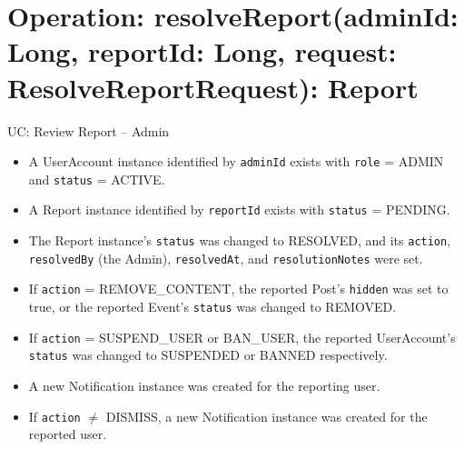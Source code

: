 \documentclass[11pt]{report}
\begin{document}
\section*{Operation: resolveReport(adminId: Long, reportId: Long, request: ResolveReportRequest): Report}
\begin{description}[leftmargin=2.8cm, style=nextline]
  \item[Cross Reference] UC: Review Report -- Admin
  \item[Preconditions]
    \begin{itemize}
      \item A UserAccount instance identified by \texttt{adminId} exists with \texttt{role} = ADMIN and \texttt{status} = ACTIVE.
      \item A Report instance identified by \texttt{reportId} exists with \texttt{status} = PENDING.
    \end{itemize}
  \item[Postconditions]
    \begin{itemize}
      \item The Report instance's \texttt{status} was changed to RESOLVED, and its \texttt{action}, \texttt{resolvedBy} (the Admin), \texttt{resolvedAt}, and \texttt{resolutionNotes} were set.
      \item If \texttt{action} = REMOVE\_CONTENT, the reported Post's \texttt{hidden} was set to true, or the reported Event's \texttt{status} was changed to REMOVED.
      \item If \texttt{action} = SUSPEND\_USER or BAN\_USER, the reported UserAccount's \texttt{status} was changed to SUSPENDED or BANNED respectively.
      \item A new Notification instance was created for the reporting user.
      \item If \texttt{action} $\neq$ DISMISS, a new Notification instance was created for the reported user.
    \end{itemize}
\end{description}
\end{document}

